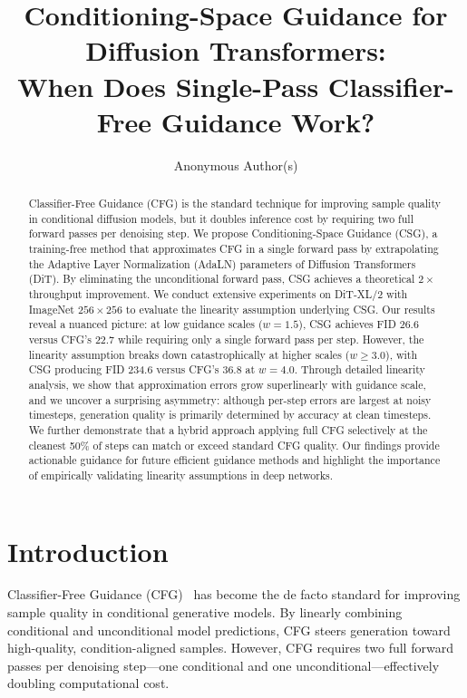 \documentclass{article}
\title{Conditioning-Space Guidance for Diffusion Transformers:\\When Does Single-Pass Classifier-Free Guidance Work?}
\author{
  Anonymous Author(s)
}
\begin{document}
\maketitle

\begin{abstract}
Classifier-Free Guidance (CFG) is the standard technique for improving sample quality in conditional diffusion models, but it doubles inference cost by requiring two full forward passes per denoising step. We propose Conditioning-Space Guidance (CSG), a training-free method that approximates CFG in a single forward pass by extrapolating the Adaptive Layer Normalization (AdaLN) parameters of Diffusion Transformers (DiT). By eliminating the unconditional forward pass, CSG achieves a theoretical $2\times$ throughput improvement. We conduct extensive experiments on DiT-XL/2 with ImageNet $256\times 256$ to evaluate the linearity assumption underlying CSG. Our results reveal a nuanced picture: at low guidance scales ($w = 1.5$), CSG achieves FID 26.6 versus CFG's 22.7 while requiring only a single forward pass per step. However, the linearity assumption breaks down catastrophically at higher scales ($w \geq 3.0$), with CSG producing FID 234.6 versus CFG's 36.8 at $w = 4.0$. Through detailed linearity analysis, we show that approximation errors grow superlinearly with guidance scale, and we uncover a surprising asymmetry: although per-step errors are largest at noisy timesteps, generation quality is primarily determined by accuracy at clean timesteps. We further demonstrate that a hybrid approach applying full CFG selectively at the cleanest 50\% of steps can match or exceed standard CFG quality. Our findings provide actionable guidance for future efficient guidance methods and highlight the importance of empirically validating linearity assumptions in deep networks.
\end{abstract}

\section{Introduction}

Classifier-Free Guidance (CFG)~\citep{ho2022classifierfree} has become the de facto standard for improving sample quality in conditional generative models. By linearly combining conditional and unconditional model predictions, CFG steers generation toward high-quality, condition-aligned samples. However, CFG requires two full forward passes per denoising step---one conditional and one unconditional---effectively doubling computational cost.
\end{document}
